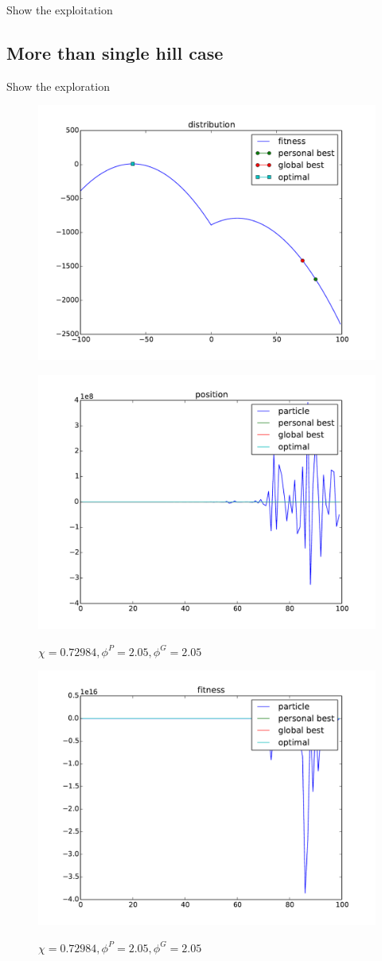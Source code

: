 Show the exploitation


\subsection{More than single hill case}

Show the exploration

\begin{figure}[ht]
\centering
\includegraphics[width=.7\linewidth]{./simfig/case2/distribution2}
\label{fig:case2-1:distribution} 
\end{figure}

\begin{figure}[ht]
\centering
\includegraphics[width=.7\linewidth]{./simfig/case2/position2-1} 
\label{fig:case2-1:position}
\caption{$ \chi = 0.72984 , \phi^{P} = 2.05 , \phi^{G} = 2.05 $ }
\end{figure}

\begin{figure}[ht]
\centering
\includegraphics[width=.7\linewidth]{./simfig/case2/fitness2-1} 
\label{fig:case2-1:fitness}
\caption{$ \chi = 0.72984 , \phi^{P} = 2.05 , \phi^{G} = 2.05 $ }
\end{figure}

